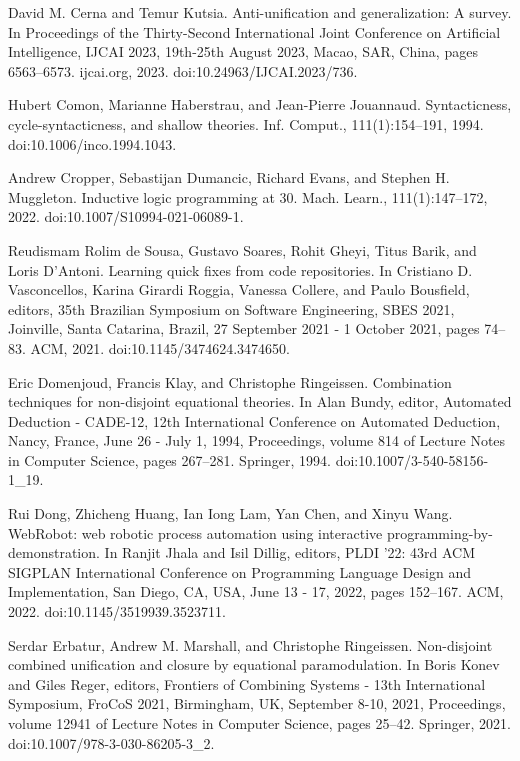 \par\noindent  [16]  David M. Cerna and Temur Kutsia.  Anti-unification and generalization: A survey.  In Proceedings of the Thirty-Second International Joint Conference on Artificial Intelligence, IJCAI 2023, 19th-25th August 2023, Macao, SAR, China, pages 6563–6573. ijcai.org, 2023.  doi:10.24963/IJCAI.2023/736.  
 
\par\noindent  [17]  Hubert Comon, Marianne Haberstrau, and Jean-Pierre Jouannaud.  Syntacticness, cycle-syntacticness, and shallow theories.  Inf. Comput., 111(1):154–191, 1994.  doi:10.1006/inco.1994.1043.  
 
\par\noindent  [18]  Andrew Cropper, Sebastijan Dumancic, Richard Evans, and Stephen H. Muggleton.  Inductive logic programming at 30.  Mach. Learn., 111(1):147–172, 2022.  doi:10.1007/S10994-021-06089-1.  
 
\par\noindent  [19]  Reudismam Rolim de Sousa, Gustavo Soares, Rohit Gheyi, Titus Barik, and Loris D’Antoni.  Learning quick fixes from code repositories.  In Cristiano D. Vasconcellos, Karina Girardi Roggia, Vanessa Collere, and Paulo Bousfield, editors, 35th Brazilian Symposium on Software Engineering, SBES 2021, Joinville, Santa Catarina, Brazil, 27 September 2021 - 1 October 2021, pages 74–83. ACM, 2021.  doi:10.1145/3474624.3474650.  
 
\par\noindent  [20]  Eric Domenjoud, Francis Klay, and Christophe Ringeissen.  Combination techniques for non-disjoint equational theories.  In Alan Bundy, editor, Automated Deduction - CADE-12, 12th International Conference on Automated Deduction, Nancy, France, June 26 - July 1, 1994, Proceedings, volume 814 of Lecture Notes in Computer Science, pages 267–281. Springer, 1994.  doi:10.1007/3-540-58156-1\_19.  
 
\par\noindent  [21]  Rui Dong, Zhicheng Huang, Ian Iong Lam, Yan Chen, and Xinyu Wang.  WebRobot: web robotic process automation using interactive programming-by-demonstration.  In Ranjit Jhala and Isil Dillig, editors, PLDI ’22: 43rd ACM SIGPLAN International Conference on Programming Language Design and Implementation, San Diego, CA, USA, June 13 - 17, 2022, pages 152–167. ACM, 2022.  doi:10.1145/3519939.3523711.  
 
\par\noindent  [22]  Serdar Erbatur, Andrew M. Marshall, and Christophe Ringeissen.  Non-disjoint combined unification and closure by equational paramodulation.  In Boris Konev and Giles Reger, editors, Frontiers of Combining Systems - 13th International Symposium, FroCoS 2021, Birmingham, UK, September 8-10, 2021, Proceedings, volume 12941 of Lecture Notes in Computer Science, pages 25–42. Springer, 2021.  doi:10.1007/978-3-030-86205-3\_2.  
 
